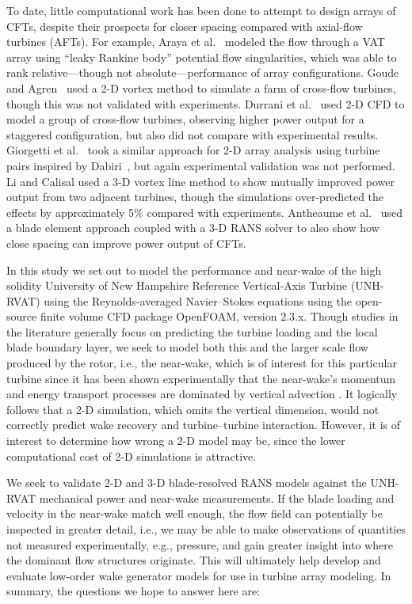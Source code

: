 \documentclass[aip,graphicx]{revtex4-1}
\begin{document}
To date, little computational work has been done to attempt to design arrays of
CFTs, despite their prospects for closer spacing compared with axial-flow
turbines (AFTs). For example, Araya et al.~\cite{Araya2014} modeled the flow
through a VAT array using ``leaky Rankine body'' potential flow singularities,
which was able to rank relative---though not absolute---performance of array
configurations. Goude and Agren~\cite{Goude2010} used a 2-D vortex method to
simulate a farm of cross-flow turbines, though this was not validated with
experiments. Durrani et al.~\cite{Durrani2011} used 2-D CFD to model a group of
cross-flow turbines, observing higher power output for a staggered
configuration, but also did not compare with experimental results. Giorgetti et
al.~\cite{Giorgetti2015} took a similar approach for 2-D array analysis using
turbine pairs inspired by Dabiri~\cite{Dabiri2011}, but again experimental
validation was not performed. Li and Calisal \cite{Li2010} used a 3-D vortex
line method to show mutually improved power output from two adjacent turbines,
though the simulations over-predicted the effects by approximately 5\% compared
with experiments. Antheaume et al.~\cite{Antheaume2008} used a blade element
approach coupled with a 3-D RANS solver to also show how close spacing can
improve power output of CFTs.

In this study we set out to model the performance and near-wake of the high
solidity University of New Hampshire Reference Vertical-Axis Turbine (UNH-RVAT)
using the Reynolds-averaged Navier--Stokes equations using the open-source
finite volume CFD package OpenFOAM, version 2.3.x. Though studies in the
literature generally focus on predicting the turbine loading and the local blade
boundary layer, we seek to model both this and the larger scale flow produced by
the rotor, i.e., the near-wake, which is of interest for this particular turbine
since it has been shown experimentally that the near-wake's momentum and energy
transport processes are dominated by vertical advection \cite{Bachant2015-JoT}.
It logically follows that a 2-D simulation, which omits the vertical dimension,
would not correctly predict wake recovery and turbine--turbine interaction.
However, it is of interest to determine how wrong a 2-D model may be, since the
lower computational cost of 2-D simulations is attractive.

We seek to validate 2-D and 3-D blade-resolved RANS models against the UNH-RVAT
mechanical power and near-wake measurements. If the blade loading and velocity
in the near-wake match well enough, the flow field can potentially be inspected
in greater detail, i.e., we may be able to make observations of quantities not
measured experimentally, e.g., pressure, and gain greater insight into where the
dominant flow structures originate. This will ultimately help develop and
evaluate low-order wake generator models for use in turbine array modeling. In
summary, the questions we hope to answer here are:
\end{document}
